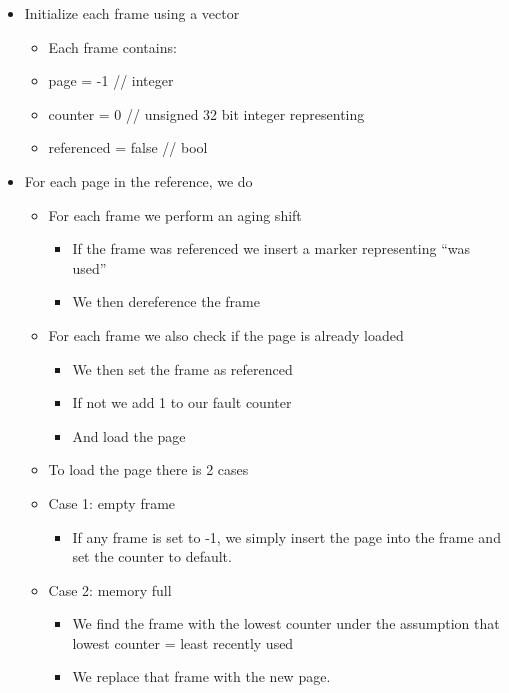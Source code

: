 \begin{itemize}
\item
  Initialize each frame using a vector

  \begin{itemize}
  \item
    Each frame contains:
  \item
    page = -1 // integer
  \item
    counter = 0 // unsigned 32 bit integer representing
  \item
    referenced = false // bool
  \end{itemize}
\item
  For each page in the reference, we do

  \begin{itemize}
  \item
    For each frame we perform an aging shift

    \begin{itemize}
    \item
      If the frame was referenced we insert a marker representing ``was
      used''
    \item
      We then dereference the frame
    \end{itemize}
  \item
    For each frame we also check if the page is already loaded

    \begin{itemize}
    \item
      We then set the frame as referenced
    \item
      If not we add 1 to our fault counter
    \item
      And load the page
    \end{itemize}
  \item
    To load the page there is 2 cases
  \item
    Case 1: empty frame

    \begin{itemize}
    \item
      If any frame is set to -1, we simply insert the page into the
      frame and set the counter to default.
    \end{itemize}
  \item
    Case 2: memory full

    \begin{itemize}
    \item
      We find the frame with the lowest counter under the assumption
      that lowest counter = least recently used
    \item
      We replace that frame with the new page.
    \end{itemize}
  \end{itemize}
\end{itemize}

